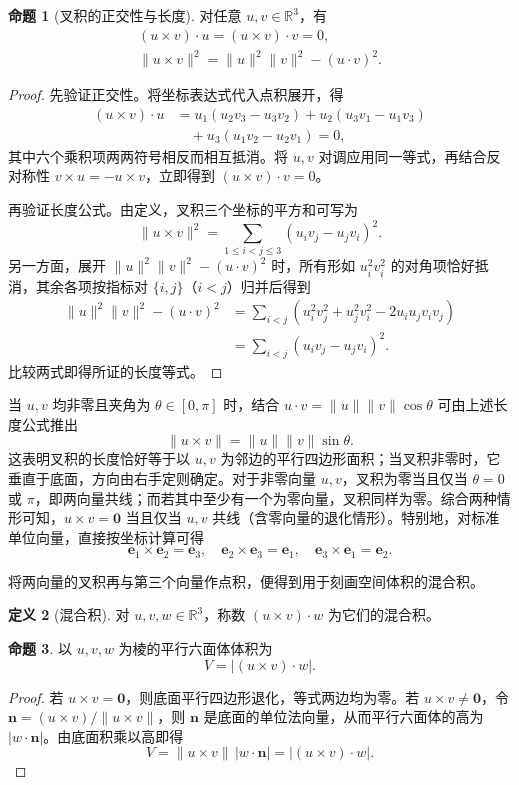 \documentclass[UTF8, fontset=fandol, a4paper, 12pt]{ctexart}
\newcommand{\R}{\mathbb{R}}
\theoremstyle{definition}
\newtheorem{definition}{定义}[section]
\newtheorem{proposition}[definition]{命题}
\begin{document}
\begin{proposition}[叉积的正交性与长度]
对任意 $u,v\in\R^3$，有
\begin{gather*}
(u\times v)\cdot u=(u\times v)\cdot v=0,\\
\|u\times v\|^2=\|u\|^2\|v\|^2-(u\cdot v)^2.
\end{gather*}
\end{proposition}
\begin{proof}
先验证正交性。将坐标表达式代入点积展开，得
\begin{align*}
(u\times v)\cdot u
&=u_1(u_2v_3-u_3v_2)+u_2(u_3v_1-u_1v_3)\\
&\quad+u_3(u_1v_2-u_2v_1)=0,
\end{align*}
其中六个乘积项两两符号相反而相互抵消。将 $u,v$ 对调应用同一等式，再结合反对称性 $v\times u=-u\times v$，立即得到 $(u\times v)\cdot v=0$。

再验证长度公式。由定义，叉积三个坐标的平方和可写为
\[
\|u\times v\|^2=\sum_{1\le i<j\le3}(u_iv_j-u_jv_i)^2.
\]
另一方面，展开 $\|u\|^2\|v\|^2-(u\cdot v)^2$ 时，所有形如 $u_i^2v_i^2$ 的对角项恰好抵消，其余各项按指标对 $\{i,j\}$（$i<j$）归并后得到
\begin{align*}
\|u\|^2\|v\|^2-(u\cdot v)^2
&=\sum_{i<j}(u_i^2v_j^2+u_j^2v_i^2-2u_iu_jv_iv_j)\\
&=\sum_{i<j}(u_iv_j-u_jv_i)^2.
\end{align*}
比较两式即得所证的长度等式。
\end{proof}

当 $u,v$ 均非零且夹角为 $\theta\in[0,\pi]$ 时，结合 $u\cdot v=\|u\|\|v\|\cos\theta$ 可由上述长度公式推出
\[
\|u\times v\|=\|u\|\|v\|\sin\theta.
\]
这表明叉积的长度恰好等于以 $u,v$ 为邻边的平行四边形面积；当叉积非零时，它垂直于底面，方向由右手定则确定。对于非零向量 $u,v$，叉积为零当且仅当 $\theta=0$ 或 $\pi$，即两向量共线；而若其中至少有一个为零向量，叉积同样为零。综合两种情形可知，$u\times v=\boldsymbol0$ 当且仅当 $u,v$ 共线（含零向量的退化情形）。特别地，对标准单位向量，直接按坐标计算可得
\[
\boldsymbol e_1\times\boldsymbol e_2=\boldsymbol e_3,\quad
\boldsymbol e_2\times\boldsymbol e_3=\boldsymbol e_1,\quad
\boldsymbol e_3\times\boldsymbol e_1=\boldsymbol e_2.
\]

将两向量的叉积再与第三个向量作点积，便得到用于刻画空间体积的混合积。

\begin{definition}[混合积]
对 $u,v,w\in\R^3$，称数 $(u\times v)\cdot w$ 为它们的混合积。
\end{definition}

\begin{proposition}
以 $u,v,w$ 为棱的平行六面体体积为
\[
V=|(u\times v)\cdot w|.
\]
\end{proposition}
\begin{proof}
若 $u\times v=\boldsymbol0$，则底面平行四边形退化，等式两边均为零。若 $u\times v\ne\boldsymbol0$，令 $\boldsymbol n=(u\times v)/\|u\times v\|$，则 $\boldsymbol n$ 是底面的单位法向量，从而平行六面体的高为 $|w\cdot\boldsymbol n|$。由底面积乘以高即得
\[
V=\|u\times v\|\,|w\cdot\boldsymbol n|=|(u\times v)\cdot w|.
\]
\end{proof}
\end{document}
